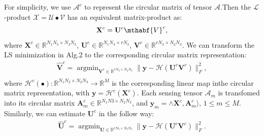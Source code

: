\documentclass[journal,article,submit,moreauthors,pdftex,10pt,a4paper]{Definitions/mdpi}
\theoremstyle{plain}
\theoremstyle{definition}
\theoremstyle{remark}
\begin{document}
For simplicity, we use $\mathcal{A}^c$ to represent the circular matrix of tensor $\mathcal{A}$.Then the $\mathcal{L}$-product $\mathcal{X} = \mathcal{U} \bullet \mathcal{V}$ has an equivalent matrix-product as:
\begin{equation}
    \mathbf{X}^c = \mathbf{U}^c\mthabf{V}^c,
\end{equation}
where $\mathbf{X}^c \in \mathbb{R}^{N_1N_3\times N_2N_3}$, $\mathbf{U}^c \in \mathbb{R}^{N_1N_3\times rN_3}$, $\mathbf{V}^c \in \mathbb{R}^{rN_3\times N_2N_3}$. We can transform the LS minimization in Alg.2 to the corresponding circular matrix representation:
\begin{eqnarray*}
    \widehat{\mathbf{V}}^c = 
    \mathop{\arg\min}_{ \mathbf{V}^c \in \mathbb{R}^{rN_3 \times N_2N_3}} \| \mathbf{y} - \mathcal{H}(\mathbf{U}^c\mathbf{V}^c) \|_F^2 , \\
\end{eqnarray*}
where $\mathcal{H}^c(\bullet): \mathbb{R}^{N_1N_2 \times N_2N_3} \to \mathbb{R}^M$ is the corresponding linear map inthe circular matrix representation, with $\mathbf{y} = \mathcal{H}^c(\mathbf{X}^c)$. Each sensing tensor $\mathcal{A}_m$ is transfomed into its circular matrix $\mathbf{A}^c_m \in \mathbb{R}^{N_1N3 \times N_2N_3}$, and $\mathbf{y}_m = \land \mathbf{X}^c, \mathbf{A}^c_m \rangle$, $1 \leq m \leq M$. Similarly, we can estimate $\mathbf{U}^c$ in the follow way:
\begin{eqnarray*}
    \widehat{\mathbf{U}}^c =
    \mathop{\arg\min}_{ \mathbf{U} \in \mathbb{R}^{rN_3 \times N_2N_3}} \| \mathbf{y} - \mathcal{H}(\mathbf{U}^c\mathbf{V}^c) \|_F^2 . \\
\end{eqnarray*}
\end{document}
